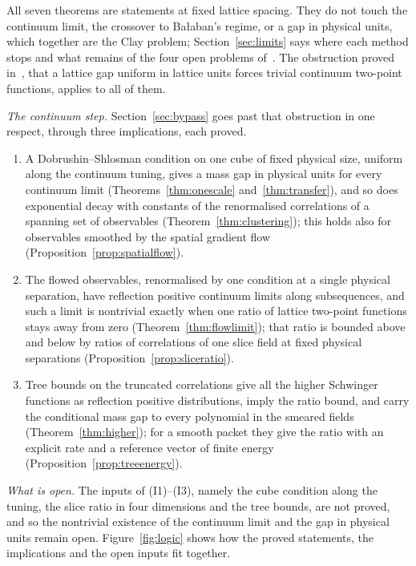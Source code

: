 \documentclass[11pt]{amsart}
\theoremstyle{definition}
\theoremstyle{remark}
\numberwithin{equation}{section}
\begin{document}
All seven theorems are statements at fixed lattice spacing. They do not touch
the continuum limit, the crossover to Ba{\l}aban's regime, or a gap in
physical units, which together are the Clay problem; Section~\ref{sec:limits}
says where each method stops and what remains of the four open problems
of~\cite{BB26a}. The obstruction proved in~\cite{BB26b}, that a lattice gap
uniform in lattice units forces trivial continuum two-point functions,
applies to all of them.

\emph{The continuum step.} Section~\ref{sec:bypass} goes past that obstruction
in one respect, through three implications, each proved.
\begin{enumerate}[label=\textup{(I\arabic*)},leftmargin=*]
\item A Dobrushin--Shlosman condition on one cube of fixed physical size,
uniform along the continuum tuning, gives a mass gap in physical units for
every continuum limit (Theorems~\ref{thm:onescale} and~\ref{thm:transfer}),
and so does exponential decay with constants of the renormalised
correlations of a spanning set of observables
(Theorem~\ref{thm:clustering}); this holds also for observables smoothed by
the spatial gradient flow
(Proposition~\ref{prop:spatialflow}).
\item The flowed observables, renormalised by one condition at a single
physical separation, have reflection positive continuum limits along
subsequences, and such a limit is nontrivial exactly when one ratio of
lattice two-point functions stays away from zero
(Theorem~\ref{thm:flowlimit}); that ratio is bounded above and below by
ratios of correlations of one slice field at fixed physical separations
(Proposition~\ref{prop:sliceratio}).
\item Tree bounds on the truncated correlations give all the higher
Schwinger functions as reflection positive distributions, imply the ratio
bound, and carry the conditional mass gap to every polynomial in the
smeared fields (Theorem~\ref{thm:higher}); for a smooth packet they give the
ratio with an explicit rate and a reference vector of finite energy
(Proposition~\ref{prop:treeenergy}).
\end{enumerate}
\emph{What is open.} The inputs of (I1)--(I3), namely the cube condition
along the tuning, the slice ratio in four dimensions and the tree bounds,
are not proved, and so the nontrivial existence of the continuum limit and
the gap in physical units remain open. Figure~\ref{fig:logic} shows how the
proved statements, the implications and the open inputs fit together.
\end{document}
